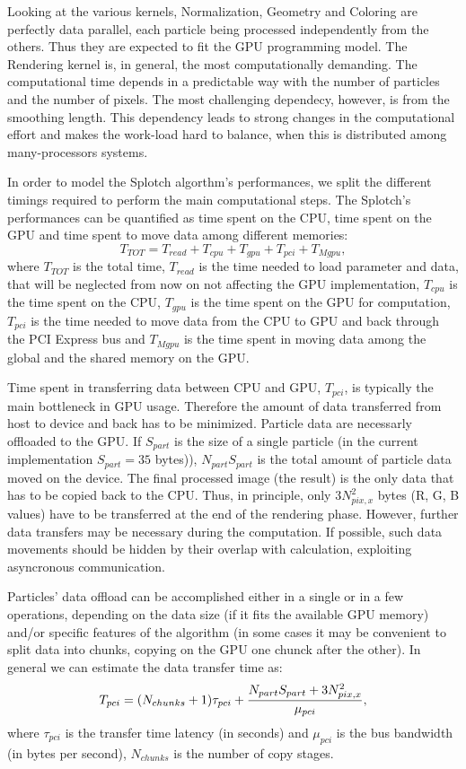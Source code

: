 \documentclass[11pt]{article}
\begin{document}
Looking at the various kernels, Normalization, Geometry and Coloring are  
perfectly data parallel, each particle being processed independently from the others.
Thus they are expected to fit the GPU programming model. 
The Rendering kernel is, in general, the most computationally demanding. 
The computational time depends in a predictable way with the number of particles and the number 
of pixels. The most challenging dependecy, however, is from the smoothing length. 
This dependency leads to strong changes in the computational effort and makes
the work-load hard to balance, when this is distributed among many-processors
systems.

In order to model the Splotch algorthm's performances, we split the different timings
required to perform the main computational steps. 
The Splotch's performances can be quantified as time spent on the CPU, time spent on the GPU
and time spent to move data among different memories:
\begin{equation}\label{Ts}
T_{TOT} = T_{read} + T_{cpu} + T_{gpu} + T_{pci} + T_{Mgpu},
\end{equation}
where $T_{TOT}$ is the total time, $T_{read}$ is the time needed to load parameter and data, that 
will be neglected from now on not affecting the GPU implementation, 
$T_{cpu}$ is the time spent on the CPU, $T_{gpu}$ is the time
spent on the GPU for computation, $T_{pci}$ is the time needed to move data from
the CPU to GPU and back through the PCI Express bus and $T_{Mgpu}$ is the time 
spent in moving data among the global and the shared memory on the GPU.

Time spent in transferring data
between CPU and GPU, $T_{pci}$, is typically the main 
bottleneck in GPU usage. Therefore the amount of data transferred from host
to device and back has to be minimized. 
Particle data are necessarly offloaded to the GPU. If $S_{part}$ is the
size of a single particle (in the current implementation $S_{part}=35$ bytes)),
$N_{part} S_{part}$ is the total amount of particle data moved on the device.
The final processed image (the result) is the only data that has to be copied back to
the CPU. Thus, in principle, only $3 N_{pix,x}^2$ bytes (R, G, B values) have to be transferred at
the end of the rendering phase. However, further data transfers may be necessary
during the computation. If possible, such data movements should be hidden
by their overlap with calculation, exploiting asyncronous communication.

Particles' data offload can be accomplished either in a single or in a few operations, 
depending on the data size (if it fits the available GPU memory) and/or
specific features of the algorithm (in some cases it may be convenient to
split data into chunks, copying on the GPU one chunck after the other).
In general we can estimate the data transfer time as:
\begin{equation}
T_{pci} =  (N_{chunks}+1) \tau_{pci} + {N_{part} S_{part} + 3 N_{pix,x}^2 \over 
\mu_{pci}},
\end{equation}
where $\tau_{pci}$ is the transfer time latency (in seconds) and $\mu_{pci}$ is the
bus bandwidth (in bytes per second), $N_{chunks}$ is the number 
of copy stages. 
\end{document}
